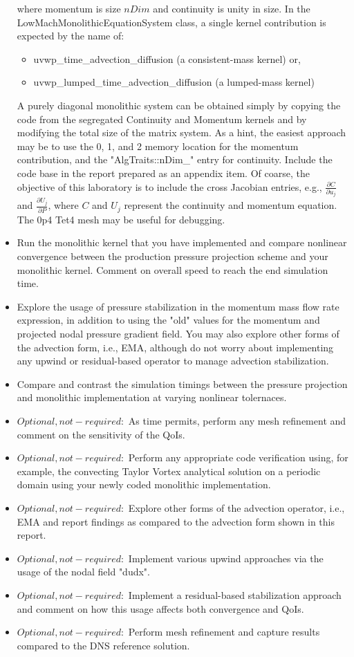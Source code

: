 \documentclass{article}
\begin{document}
\begin{itemize}
		where momentum is size $nDim$ and continuity is unity in size. In the LowMachMonolithicEquationSystem class, a single kernel contribution is expected 
		by the name of: 
			\begin{itemize}
				\item uvwp\_time\_advection\_diffusion (a consistent-mass kernel) or,
				\item uvwp\_lumped\_time\_advection\_diffusion (a lumped-mass kernel)
			\end{itemize}
		A purely diagonal monolithic system can be obtained simply by copying the code from the segregated Continuity and Momentum
		kernels and by modifying the total size of the matrix system. As a hint, the easiest approach may be to use the 0, 1, and 2 memory location for the momentum
		contribution, and the "AlgTraits::nDim\_" entry for continuity. Include the code base in the report prepared as an appendix item. Of coarse, the objective
		of this laboratory is to include the cross Jacobian entries, e.g., $\frac{\partial C}{\partial u_j}$ and $\frac{\partial U_j}{\partial P}$, where $C$ and $U_j$ represent the
		continuity and momentum equation. The 0p4 Tet4 mesh may be useful for debugging.
	\item Run the monolithic kernel that you have implemented and compare nonlinear convergence between the production pressure projection scheme and your 
		monolithic kernel. Comment on overall speed to reach the end simulation time.
	\item Explore the usage of pressure stabilization in the momentum mass flow rate expression, in addition 
		to using the "old" values for the momentum and projected nodal pressure gradient field. You may also explore other forms of the
		advection form, i.e., EMA, although do not worry about implementing any upwind or residual-based operator to manage advection stabilization.
	\item Compare and contrast the simulation timings between the pressure projection and monolithic implementation at varying nonlinear tolernaces. 
	\item $Optional, not-required:$ As time permits, perform any mesh refinement and comment on the sensitivity of the QoIs.
	\item $Optional, not-required:$ Perform any appropriate code verification using, for example, the convecting Taylor Vortex analytical solution
		on a periodic domain using your newly coded monolithic implementation.		
	\item $Optional, not-required:$ Explore other forms of the advection operator, i.e., EMA and report findings as compared to the advection form shown in this report.
	\item $Optional, not-required:$ Implement various upwind approaches via the usage of the nodal field "dudx".
	\item $Optional, not-required:$ Implement a residual-based stabilization approach and comment on how this usage affects both convergence and QoIs.
	\item $Optional, not-required:$ Perform mesh refinement and capture results compared to the DNS reference solution.
\end{itemize}




\end{document}
